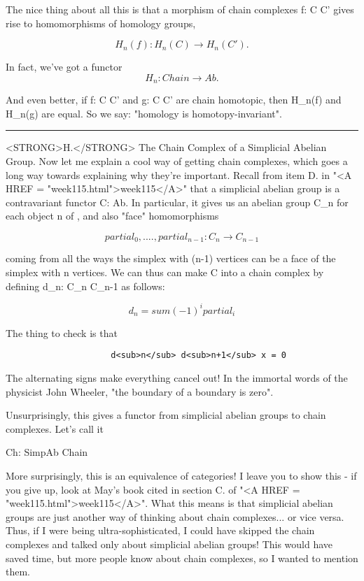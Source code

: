 The nice thing about all this is that a morphism of chain complexes
f: C \to  C' gives rise to homomorphisms of homology groups, 
 
$$
                H_{n}(f): H_{n}(C) \to  H_{n}(C').
$$
    
In fact, we've got a functor
$$
                H_{n}: Chain \to  Ab.
$$
    
And even better, if f: C \to  C' and g: C \to  C' are chain homotopic, then
H_{n}(f) and H_{n}(g) are equal.  So we say: "homology is homotopy-invariant".

\par\noindent\rule{\textwidth}{0.4pt}
<STRONG>H.</STRONG> The Chain Complex of a Simplicial Abelian Group.
Now let me explain a cool way of getting chain complexes, which goes a
long way towards explaining why they're important.  Recall from item
D. in "<A HREF = "week115.html">week115</A>" that a
simplicial abelian group is a contravariant functor C: \Delta  \to 
Ab.  In particular, it gives us an abelian group C_{n} for
each object n of \Delta , and also "face" homomorphisms

$$
         partial_{0}, ...., partial_{n-1}: C_{n} \to  C_{n-1}
$$
    
coming from all the ways the simplex with (n-1) vertices can be a face
of the simplex with n vertices.  We can thus can make C into a chain
complex by defining d_{n}: C_{n} \to  C_{n-1} as follows:
                        
$$
                d_{n} = sum (-1)^{i} partial_{i} 
$$
    
The thing to check is that 
\begin{verbatim}
                     d<sub>n</sub> d<sub>n+1</sub> x = 0 
\end{verbatim}
    
The alternating signs make everything cancel out!  In the immortal words
of the physicist John Wheeler, "the boundary of a boundary is zero".  

Unsurprisingly, this gives a functor from simplicial abelian groups
to chain complexes.  Let's call it

                Ch: SimpAb \to  Chain

More surprisingly, this is an equivalence of categories!  I leave you to
show this - if you give up, look at May's book cited in section C. of
"<A HREF = "week115.html">week115</A>".  What this means is that simplicial abelian groups are just
another way of thinking about chain complexes...  or vice versa.  Thus,
if I were being ultra-sophisticated, I could have skipped the chain
complexes and talked only about simplicial abelian groups!  This would
have saved time, but more people know about chain complexes, so I wanted
to mention them.

